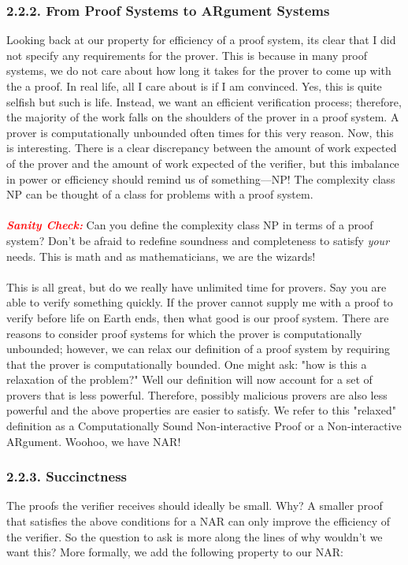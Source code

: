 \documentclass{article}
\begin{document}
\subsubsection*{2.2.2. From Proof Systems to ARgument Systems}
Looking back at our property for efficiency of a proof system, its clear that I did not specify any requirements for the prover. This is because in many proof systems, we do not care about how long it takes for the prover to come up with the a proof. In real life, all I care about is if I am convinced. Yes, this is quite selfish but such is life. Instead, we want an efficient verification process; therefore, the majority of the work falls on the shoulders of the prover in a proof system. A prover is computationally unbounded often times for this very reason. Now, this is interesting. There is a clear discrepancy between the amount of work expected of the prover and the amount of work expected of the verifier, but this imbalance in power or efficiency should remind us of something––\textsc{NP}! The complexity class \textsc{NP} can be thought of a class for problems with a proof system. \\ \\
\noindent \textbf{\textit{\textcolor{red}{Sanity Check:}}} Can you define the complexity class \textsc{NP} in terms of a proof system? Don't be afraid to redefine soundness and completeness to satisfy \textit{your} needs. This is math and as mathematicians, we are the wizards! \\ \\
\noindent This is all great, but do we really have unlimited time for provers. Say you are able to verify something quickly. If the prover cannot supply me with a proof to verify before life on Earth ends, then what good is our proof system. There are reasons to consider proof systems for which the prover is computationally unbounded; however, we can relax our definition of a proof system by requiring that the prover is computationally bounded. One might ask: "how is this a relaxation of the problem?" Well our definition will now account for a set of provers that is less powerful. Therefore, possibly malicious provers are also less powerful and the above properties are easier to satisfy. We refer to this "relaxed" definition as a Computationally Sound Non-interactive Proof or a Non-interactive ARgument. Woohoo, we have NAR!
\subsubsection*{2.2.3. Succinctness}
The proofs the verifier receives should ideally be small. Why? A smaller proof that satisfies the above conditions for a NAR can only improve the efficiency of the verifier. So the question to ask is more along the lines of why wouldn't we want this? More formally, we add the following property to our NAR:
\end{document}
